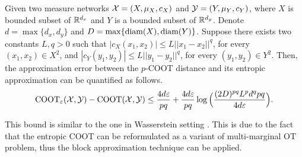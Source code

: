 
\begin{proposition} \label{prop:quant_bound_ent}
  Given two measure networks $\mathcal X = (X, \mu_X, c_X)$ and $\mathcal Y = (Y, \mu_Y, c_Y)$,
  where $X$ is bounded subset of $\mathbb R^{d_x}$ and $Y$ is a bounded subset
  of $\mathbb R^{d_y}$. Denote $d = \max \{d_x, d_y \}$ and $D = \max\{ \text{diam}(X), \text{diam}(Y) \}$.
  Suppose there exists two constants $L, q > 0$ such that
  $|c_X(x_1, x_2)| \leq L \vert\vert x_1 - x_2 \vert\vert^q$, for every $(x_1,x_2) \in X^2$, and
  $|c_Y(y_1, y_2)| \leq L \vert\vert y_1 - y_2 \vert\vert^q$, for every $(y_1,y_2) \in Y^2$.
  Then, the approximation error between the $p$-COOT distance
  and its entropic approximation can be quantified as follows.
  \begin{equation}
    \text{COOT}_{\varepsilon}(\mathcal X, \mathcal Y) - \text{COOT}(\mathcal X, \mathcal Y) \leq
    \frac{4d \varepsilon}{pq}
    + \frac{4d \varepsilon}{pq} \log \Big( \frac{(2D)^{pq} L^p d^q pq}{4d \varepsilon} \Big).
  \end{equation}
\end{proposition}
This bound is similar to the one in Wasserstein setting \citep{Genevay19}.
This is due to the fact
that the entropic COOT can be reformulated as a variant of multi-marginal OT problem,
thus the block approximation technique \citep{Carlier17} can be applied.

